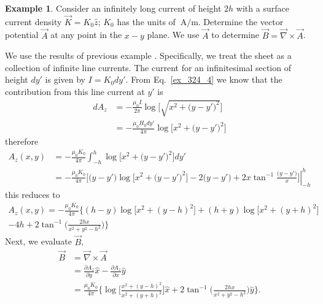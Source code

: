 \documentclass[11pt,a4paper,oneside]{book}
\numberwithin{equation}{section}
\theoremstyle{it}
\theoremstyle{definition}
\newtheorem{example}{Example}[section]
\begin{document}
\begin{example}
Consider an infinitely long current of height $2h$ with a surface current density $\vec{K}=K_0\hat{z}$; $K_0$ has the units of $\SI{}{\ampere\per\meter}$. Determine the vector potential $\vec{A}$ at any point in the $x-y$ plane. We use $\vec{A}$ to determine $\vec{B}=\vec{\nabla}\times\vec{A}$.

We use the results of previous example . Specifically, we treat the sheet as a collection  of infinite line currents. The current for an infinitesimal section of height $dy'$ is given by $I=K_0dy'$. From Eq.~\eqref{ex_324_4} we know that the contribution from this line current at $y'$ is
 \begin{equation}\label{ex_325_1}
	\begin{aligned}
		dA_z&=-\frac{\mu_0 I}{2\pi}\log\Big[\sqrt{x^2+\big(y-y'\big)^2}\Big] \\[6pt]
		&= -\frac{\mu_0 H_0 dy'}{4\pi}\log\Big[x^2+\big(y-y'\big)^2\Big]
	\end{aligned}
\end{equation}
therefore 
 \begin{equation}\label{ex_325_2}
	\begin{aligned}
		A_z(x,y)&=-\frac{\mu_0 K_0}{4\pi} \int_{-h}^{h}\log\Big[x^2+\big(y-y'\big)^2\Big]dy'\\[6pt]
		&= -\frac{\mu_0K_0}{4\pi}\left. \Big[\big(y-y'\big)\log\big[x^2+\big(y-y'\big)^2\big]-2\big(y-y'\big)+2x\tan^{-1}\frac{\big(y-y'\big)}{x}\Big]\right| _{-h}^h
	\end{aligned}
\end{equation}
this reduces to
 \begin{equation}\label{ex_325_3}
	\begin{aligned}
		A_z(x,y)=-\frac{\mu_0 K_0}{4\pi} \Biggl\{ (h-y)\log\big[x^2+(y-h)^2\big]+(h+y)\log\big[x^2+(y+h)^2\big] \\[6pt]
		 -4h+2\tan^{-1}\Big(\frac{2hx}{x^2+y^2-h^2}\Big)\Biggr\}
	\end{aligned}
\end{equation}
Next, we evaluate $\vec{B}$,
 \begin{equation}\label{ex_325_4}
	\begin{aligned}
		\vec{B}&=\vec{\nabla}\times\vec{A} \\[6pt]
		&=\frac{\partial A_z}{\partial y}\hat{x}-\frac{\partial A_z}{\partial x}\hat{y} \\[6pt]
		&= \frac{\mu_0 K_0}{4\pi}\Biggl\{\log\Big[\frac{x^2+(y-h)^2}{x^2+(y+h)^2}\Big]\hat{x}+2\tan^{-1}\Big(\frac{2hx}{x^2+y^2-h^2}\Big)\hat{y}\Biggr\}.
	\end{aligned}
\end{equation}
\end{example}
\end{document}
